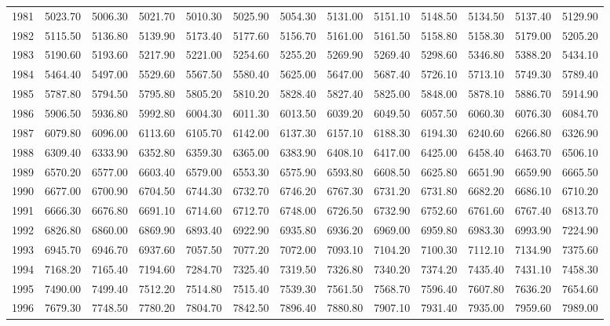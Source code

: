 \begin{longtable}{rrrrrrrrrrrrr}
  1981 & 5023.70 & 5006.30 & 5021.70 & 5010.30 & 5025.90 & 5054.30 & 5131.00 & 5151.10 & 5148.50 & 5134.50 & 5137.40 & 5129.90 \\ 
  1982 & 5115.50 & 5136.80 & 5139.90 & 5173.40 & 5177.60 & 5156.70 & 5161.00 & 5161.50 & 5158.80 & 5158.30 & 5179.00 & 5205.20 \\ 
  1983 & 5190.60 & 5193.60 & 5217.90 & 5221.00 & 5254.60 & 5255.20 & 5269.90 & 5269.40 & 5298.60 & 5346.80 & 5388.20 & 5434.10 \\ 
  1984 & 5464.40 & 5497.00 & 5529.60 & 5567.50 & 5580.40 & 5625.00 & 5647.00 & 5687.40 & 5726.10 & 5713.10 & 5749.30 & 5789.40 \\ 
  1985 & 5787.80 & 5794.50 & 5795.80 & 5805.20 & 5810.20 & 5828.40 & 5827.40 & 5825.00 & 5848.00 & 5878.10 & 5886.70 & 5914.90 \\ 
  1986 & 5906.50 & 5936.80 & 5992.80 & 6004.30 & 6011.30 & 6013.50 & 6039.20 & 6049.50 & 6057.50 & 6060.30 & 6076.30 & 6084.70 \\ 
  1987 & 6079.80 & 6096.00 & 6113.60 & 6105.70 & 6142.00 & 6137.30 & 6157.10 & 6188.30 & 6194.30 & 6240.60 & 6266.80 & 6326.90 \\ 
  1988 & 6309.40 & 6333.90 & 6352.80 & 6359.30 & 6365.00 & 6383.90 & 6408.10 & 6417.00 & 6425.00 & 6458.40 & 6463.70 & 6506.10 \\ 
  1989 & 6570.20 & 6577.00 & 6603.40 & 6579.00 & 6553.30 & 6575.90 & 6593.80 & 6608.50 & 6625.80 & 6651.90 & 6659.90 & 6665.50 \\ 
  1990 & 6677.00 & 6700.90 & 6704.50 & 6744.30 & 6732.70 & 6746.20 & 6767.30 & 6731.20 & 6731.80 & 6682.20 & 6686.10 & 6710.20 \\ 
  1991 & 6666.30 & 6676.80 & 6691.10 & 6714.60 & 6712.70 & 6748.00 & 6726.50 & 6732.90 & 6752.60 & 6761.60 & 6767.40 & 6813.70 \\ 
  1992 & 6826.80 & 6860.00 & 6869.90 & 6893.40 & 6922.90 & 6935.80 & 6936.20 & 6969.00 & 6959.80 & 6983.30 & 6993.90 & 7224.90 \\ 
  1993 & 6945.70 & 6946.70 & 6937.60 & 7057.50 & 7077.20 & 7072.00 & 7093.10 & 7104.20 & 7100.30 & 7112.10 & 7134.90 & 7375.60 \\ 
  1994 & 7168.20 & 7165.40 & 7194.60 & 7284.70 & 7325.40 & 7319.50 & 7326.80 & 7340.20 & 7374.20 & 7435.40 & 7431.10 & 7458.30 \\ 
  1995 & 7490.00 & 7499.40 & 7512.20 & 7514.80 & 7515.40 & 7539.30 & 7561.50 & 7568.70 & 7596.40 & 7607.80 & 7636.20 & 7654.60 \\ 
  1996 & 7679.30 & 7748.50 & 7780.20 & 7804.70 & 7842.50 & 7896.40 & 7880.80 & 7907.10 & 7931.40 & 7935.00 & 7959.60 & 7989.00 \\ 

\end{longtable}
